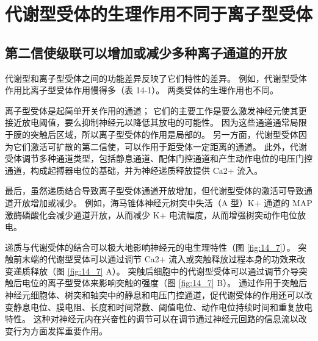 \section{代谢型受体的生理作用不同于离子型受体}

\subsection{第二信使级联可以增加或减少多种离子通道的开放}
代谢型和离子型受体之间的功能差异反映了它们特性的差异。 
例如，代谢型受体作用比离子型受体作用慢得多（表 14-1）。 
两类受体的生理作用也不同。


离子型受体是起简单开关作用的通道； 
它们的主要工作是要么激发神经元使其更接近放电阈值，要么抑制神经元以降低其放电的可能性。 
因为这些通道通常局限于膜的突触后区域，所以离子型受体的作用是局部的。 
另一方面，代谢型受体因为它们激活可扩散的第二信使，可以作用于距受体一定距离的通道。 
此外，代谢受体调节多种通道类型，包括静息通道、配体门控通道和产生动作电位的电压门控通道，构成起搏器电位的基础，并为神经递质释放提供 Ca2+ 流入。


最后，虽然递质结合导致离子型受体通道开放增加，但代谢型受体的激活可导致通道开放增加或减少。 
例如，海马锥体神经元树突中失活（A 型）K+ 通道的 MAP 激酶磷酸化会减少通道开放，从而减少 K+ 电流幅度，从而增强树突动作电位放电。


递质与代谢受体的结合可以极大地影响神经元的电生理特性（图 \ref{fig:14_7}）。 
突触前末端的代谢型受体可以通过调节 Ca2+ 流入或突触释放过程本身的功效来改变递质释放（图 \ref{fig:14_7} A）。 
突触后细胞中的代谢型受体可以通过调节介导突触后电位的离子型受体来影响突触的强度（图 \ref{fig:14_7} B）。
通过作用于突触后神经元细胞体、树突和轴突中的静息和电压门控通道，促代谢受体的作用还可以改变静息电位、膜电阻、长度和时间常数、阈值电位、动作电位持续时间和重复放电特性。
这种对神经元内在兴奋性的调节可以在调节通过神经元回路的信息流以改变行为方面发挥重要作用。

